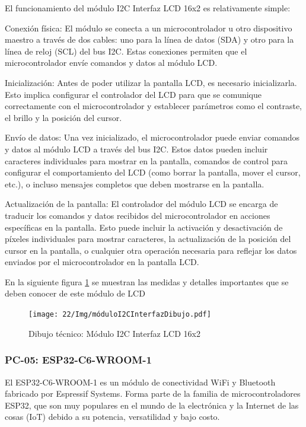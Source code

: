     El funcionamiento del módulo I2C Interfaz LCD 16x2 es relativamente simple:
    
    Conexión física: El módulo se conecta a un microcontrolador u otro dispositivo maestro a través de dos cables: uno para la línea de datos (SDA) y otro para la línea de reloj (SCL) del bus I2C. Estas conexiones permiten que el microcontrolador envíe comandos y datos al módulo LCD.
    
    Inicialización: Antes de poder utilizar la pantalla LCD, es necesario inicializarla. Esto implica configurar el controlador del LCD para que se comunique correctamente con el microcontrolador y establecer parámetros como el contraste, el brillo y la posición del cursor.
    
    Envío de datos: Una vez inicializado, el microcontrolador puede enviar comandos y datos al módulo LCD a través del bus I2C. Estos datos pueden incluir caracteres individuales para mostrar en la pantalla, comandos de control para configurar el comportamiento del LCD (como borrar la pantalla, mover el cursor, etc.), o incluso mensajes completos que deben mostrarse en la pantalla.
    
    Actualización de la pantalla: El controlador del módulo LCD se encarga de traducir los comandos y datos recibidos del microcontrolador en acciones específicas en la pantalla. Esto puede incluir la activación y desactivación de píxeles individuales para mostrar caracteres, la actualización de la posición del cursor en la pantalla, o cualquier otra operación necesaria para reflejar los datos enviados por el microcontrolador en la pantalla LCD.
    
    En la siguiente figura \ref{fig:modulo} se muestran las medidas y detalles importantes que se deben conocer de este módulo de LCD
    \begin{figure}[H]
        \centering
        \texttt{[image: 22/Img/móduloI2CInterfazDibujo.pdf]}
        \caption{Dibujo técnico: Módulo I2C Interfaz LCD 16x2}
        \label{fig:modulo}
    \end{figure}
    
    
    \subsubsection{PC-05: ESP32-C6-WROOM-1 }
    
    El ESP32-C6-WROOM-1 es un módulo de conectividad WiFi y Bluetooth fabricado por Espressif Systems. Forma parte de la familia de microcontroladores ESP32, que son muy populares en el mundo de la electrónica y la Internet de las cosas (IoT) debido a su potencia, versatilidad y bajo costo.
    
